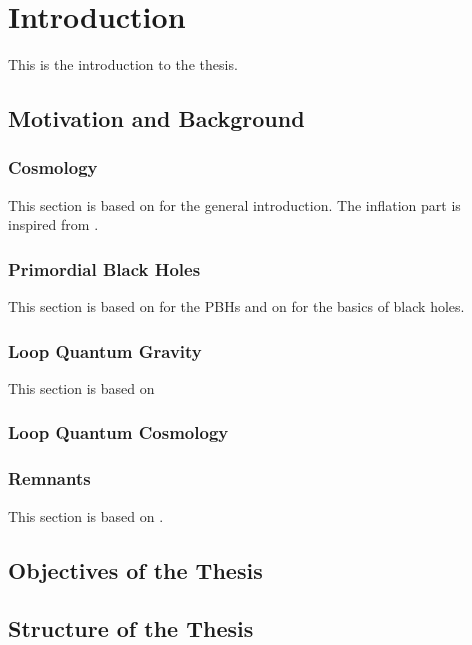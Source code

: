 \chapter{Introduction}%
This is the introduction to the thesis.
\section{Motivation and Background}

\subsection{Cosmology}%
This section is based on \citep{Baumann:2022,Peter:2013avv} for the general introduction. The inflation part is inspired from \citep{Baumann:2009ds}.


\subsection{Primordial Black Holes}%
This section is based on \citep{Carr_2024,bagui2023} for the PBHs and on \citep{Chrusciel:2020fql} for the basics of black holes.

\subsection{Loop Quantum Gravity}%
This section is based on \citep{Rovelli:2014ssa}

\subsection{Loop Quantum Cosmology}%


\subsection{Remnants}%
This section is based on \citep{Rovelli:2024sjl}.

\section{Objectives of the Thesis}%

\section{Structure of the Thesis}%
